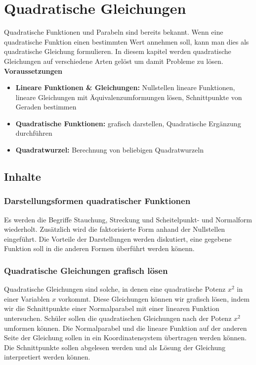 \documentclass{article}
\begin{document}
\newpage
\section{Quadratische Gleichungen}
Quadratische Funktionen und Parabeln sind bereits bekannt. Wenn eine quadratische Funktion einen bestimmten Wert annehmen soll, kann man dies als quadratische Gleichung formulieren.
In diesem kapitel werden quadratische Gleichungen auf verschiedene Arten gelöst um damit Probleme zu lösen.\\
\textbf{Voraussetzungen}
\begin{itemize}
    \item \textbf{Lineare Funktionen \& Gleichungen: } Nullstellen lineare Funktionen, lineare Gleichungen mit Äquivalenzumformungen lösen, Schnittpunkte von Geraden bestimmen
    \item \textbf{Quadratische Funktionen: } grafisch darstellen, Quadratische Ergänzung durchführen
    \item \textbf{Quadratwurzel: } Berechnung von beliebigen Quadratwurzeln
\end{itemize}
\subsection{Inhalte}
\subsubsection*{Darstellungsformen quadratischer Funktionen}
Es werden die Begriffe Stauchung, Streckung und Scheitelpunkt- und Normalform wiederholt. Zusätzlich wird die faktorisierte Form anhand der Nullstellen eingeführt.
Die Vorteile der Darstellungen werden diskutiert, eine gegebene Funktion soll in die anderen Formen überführt werden könenn.
\subsubsection*{Quadratische Gleichungen grafisch lösen}
Quadratische Gleichungen sind solche, in denen eine quadratische Potenz $x^2$ in einer Variablen $x$ vorkommt. 
Diese Gleichungen können wir grafisch lösen, indem wir die Schnittpunkte einer Normalparabel mit einer linearen Funktion untersuchen.
Schüler sollen die quadratischen Gleichungen nach der Potenz $x^2$ umformen können. Die Normalparabel und die lineare Funktion auf der anderen Seite der Gleichung sollen in ein Koordinatensystem übertragen werden können.
Die Schnittpunkte sollen abgelesen werden und als Lösung der Gleichung interpretiert werden können.
\end{document}
